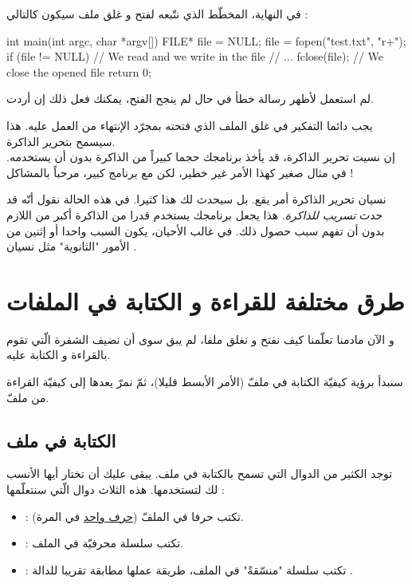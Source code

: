 في النهاية، المخطّط الذي نتّبعه لفتح و غلق ملف سيكون كالتالي :

\begin{Csource}
int main(int argc, char *argv[])
{
	FILE* file = NULL;
	file = fopen("test.txt", "r+");
	if (file != NULL)
	{
    		// We read and we write in the file
    		// ...
    		fclose(file); // We close the opened file
	}
	return 0;
}
\end{Csource}

لم استعمل
لأظهر رسالة خطأ في حال لم ينجح الفتح، يمكنك فعل ذلك إن أردت.

يجب دائما التفكير في غلق الملف الذي فتحته بمجرّد الإنتهاء من العمل عليه. هذا سيسمح بتحرير الذاكرة.\\
إن نسيت تحرير الذاكرة، قد يأخذ برنامجك حجما كبيراً من الذاكرة بدون أن يستخدمه. في مثال صغير كهذا الأمر غير خطير، لكن مع برنامج كبير، مرحباً بالمشاكل !

نسيان تحرير الذاكرة أمر يقع. بل سيحدث لك هذا كثيرا. في هذه الحالة نقول أنّه قد حدث
\textit{تسريب للذاكرة}.
هذا يجعل برنامجك يستخدم قدرا من الذاكرة أكبر من اللازم بدون أن تفهم سبب حصول ذلك. في غالب الأحيان، يكون السبب واحدا أو إثنين من الأمور "الثانوية" مثل نسيان
.

\section{طرق مختلفة للقراءة و الكتابة في الملفات}
و الآن مادمنا تعلّمنا كيف نفتح و نغلق ملفا، لم يبق سوى أن نضيف الشفرة الّتي تقوم بالقراءة و الكتابة عليه.

سنبدأ برؤية كيفيّة الكتابة في ملفّ (الأمر الأبسط قليلا)، ثمّ نمرّ يعدها إلى كيفيّة القراءة من ملفّ.

\subsection{الكتابة في ملف}
توجد الكثير من الدوال التي تسمح بالكتابة في ملف. يبقى عليك أن تختار أيها الأنسب لك لتستخدمها.
هذه الثلاث دوال الّتي سنتعلّمها :
\begin{itemize}
  \item {} :
  تكتب حرفا في الملفّ
  (\underline{حرف واحد}
  في المرة).
  \item {} :
تكتب سلسلة محرفيّة في الملف.
  \item {} :
تكتب سلسلة "منسّقةً" في الملف، طريقة عملها مطابقة تقريبا للدالة
.
\end{itemize}

